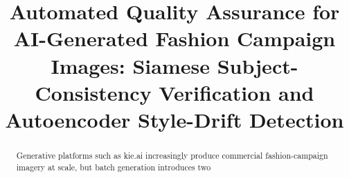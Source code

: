 \documentclass[conference]{IEEEtran}
\begin{document}
\title{Automated Quality Assurance for AI-Generated Fashion Campaign Images:
Siamese Subject-Consistency Verification and Autoencoder Style-Drift Detection}

\author{
}

\maketitle

\begin{abstract}
%
%
Generative platforms such as kie.ai increasingly produce commercial
fashion-campaign imagery at scale, but batch generation introduces two

\end{abstract}
\end{document}
